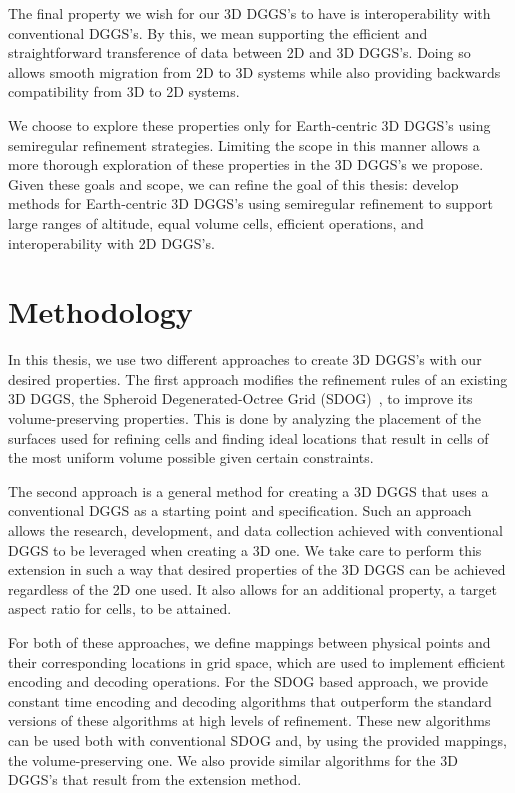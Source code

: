 The final property we wish for our 3D DGGS's to have is interoperability with conventional DGGS's.
By this, we mean supporting the efficient and straightforward transference of data between 2D and 3D DGGS's.
Doing so allows smooth migration from 2D to 3D systems while also providing backwards compatibility from 3D to 2D systems.


We choose to explore these properties only for Earth-centric 3D DGGS's using semiregular refinement strategies.
Limiting the scope in this manner allows a more thorough exploration of these properties in the 3D DGGS's we propose.
Given these goals and scope, we can refine the goal of this thesis: develop methods for Earth-centric 3D DGGS's using semiregular refinement to support large ranges of altitude, equal volume cells, efficient operations, and interoperability with 2D DGGS's.


\section{Methodology}
In this thesis, we use two different approaches to create 3D DGGS's with our desired properties.
The first approach modifies the refinement rules of an existing 3D DGGS, the Spheroid Degenerated-Octree Grid (SDOG)~\cite{yu2009sdog}, to improve its volume-preserving properties.
This is done by analyzing the placement of the surfaces used for refining cells and finding ideal locations that result in cells of the most uniform volume possible given certain constraints.


The second approach is a general method for creating a 3D DGGS that uses a conventional DGGS as a starting point and specification.
Such an approach allows the research, development, and data collection achieved with conventional DGGS to be leveraged when creating a 3D one.
We take care to perform this extension in such a way that desired properties of the 3D DGGS can be achieved regardless of the 2D one used.
It also allows for an additional property, a target aspect ratio for cells, to be attained.


For both of these approaches, we define mappings between physical points and their corresponding locations in grid space, which are used to implement efficient encoding and decoding operations.
For the SDOG based approach, we provide constant time encoding and decoding algorithms that outperform the standard versions of these algorithms at high levels of refinement.
These new algorithms can be used both with conventional SDOG and, by using the provided mappings, the volume-preserving one.
We also provide similar algorithms for the 3D DGGS's that result from the extension method.


